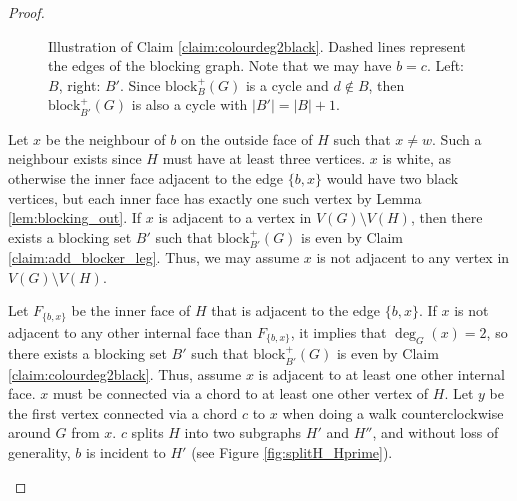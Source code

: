 \documentclass{patmorin}
\newcommand{\block}{\mathrm{block}}
\begin{document}
\begin{proof}
\begin{figure}[!ht]
 
  \caption{Illustration of Claim \ref{claim:colourdeg2black}. Dashed lines represent the edges of the blocking graph. Note that we may have $b=c$. Left: $B$, right: $B'$. Since $\block_{B}^+(G)$ is a cycle and $d \notin B$, then $\block_{B'}^+(G)$ is also a cycle with $|B'| = |B| +1$.}
  \label{fig:colourdeg2black}
  
\end{figure}
  
Let $x$ be the neighbour of $b$ on the outside face of $H$ such that $x\not=w$. Such a neighbour exists since $H$ must have at least three vertices. $x$ is white, as otherwise the inner face adjacent to the edge $\{b,x\}$ would have two black vertices, but each inner face has exactly one such vertex by Lemma \ref{lem:blocking_out}. If $x$ is adjacent to a vertex in $V(G)\setminus V(H)$, then there exists a blocking set $B'$ such that $\block_{B'}^+(G)$ is even by Claim \ref{claim:add_blocker_leg}. Thus, we may assume $x$ is not adjacent to any vertex in $V(G)\setminus V(H)$.

Let $F_{\{b,x\}}$ be the inner face of $H$ that is adjacent to the edge $\{b,x\}$. If $x$ is not adjacent to any other internal face than $F_{\{b,x\}}$, it implies that $\deg_G(x)=2$, so there exists a blocking set $B'$ such that $\block_{B'}^+(G)$ is even by Claim \ref{claim:colourdeg2black}. Thus, assume $x$ is adjacent to at least one other internal face. $x$ must be connected via a chord to at least one other vertex of $H$. Let $y$ be the first vertex connected via a chord $c$ to $x$ when doing a walk counterclockwise around $G$ from $x$. $c$ splits $H$ into two subgraphs $H'$ and $H''$, and without loss of generality, $b$ is incident to $H'$ (see Figure \ref{fig:splitH_Hprime}).

\begin{figure}[!ht]
  \centering
  

\end{figure}
\end{proof}
\end{document}

